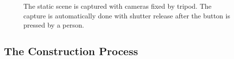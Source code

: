 \begin{figure}[t!]
{\begin{minipage}[t]{0.35\textwidth}
\end{minipage}
}\vspace{-3mm}
    \caption{The static scene is captured with cameras fixed by tripod. The capture is automatically done with shutter release after the button is pressed by a person.}
    \label{fig6-2}
\end{figure}

\subsection{The Construction Process}

